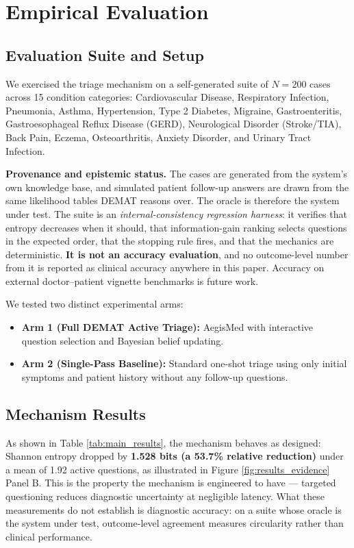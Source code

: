 \documentclass[10pt,twocolumn]{article}
\begin{document}
\section{Empirical Evaluation}

\subsection{Evaluation Suite and Setup}
We exercised the triage mechanism on a self-generated suite of $N = 200$ cases across 15 condition categories: Cardiovascular Disease, Respiratory Infection, Pneumonia, Asthma, Hypertension, Type 2 Diabetes, Migraine, Gastroenteritis, Gastroesophageal Reflux Disease (GERD), Neurological Disorder (Stroke/TIA), Back Pain, Eczema, Osteoarthritis, Anxiety Disorder, and Urinary Tract Infection.

\textbf{Provenance and epistemic status.} The cases are generated from the system's own knowledge base, and simulated patient follow-up answers are drawn from the same likelihood tables DEMAT reasons over. The oracle is therefore the system under test. The suite is an \emph{internal-consistency regression harness}: it verifies that entropy decreases when it should, that information-gain ranking selects questions in the expected order, that the stopping rule fires, and that the mechanics are deterministic. \textbf{It is not an accuracy evaluation}, and no outcome-level number from it is reported as clinical accuracy anywhere in this paper. Accuracy on external doctor--patient vignette benchmarks is future work.

We tested two distinct experimental arms:
\begin{itemize}
    \item \textbf{Arm 1 (Full DEMAT Active Triage):} AegisMed with interactive question selection and Bayesian belief updating.
    \item \textbf{Arm 2 (Single-Pass Baseline):} Standard one-shot triage using only initial symptoms and patient history without any follow-up questions.
\end{itemize}

\subsection{Mechanism Results}
As shown in Table \ref{tab:main_results}, the mechanism behaves as designed: Shannon entropy dropped by \textbf{1.528 bits (a 53.7\% relative reduction)} under a mean of 1.92 active questions, as illustrated in Figure \ref{fig:results_evidence} Panel B. This is the property the mechanism is engineered to have --- targeted questioning reduces diagnostic uncertainty at negligible latency. What these measurements do not establish is diagnostic accuracy: on a suite whose oracle is the system under test, outcome-level agreement measures circularity rather than clinical performance.
\end{document}
